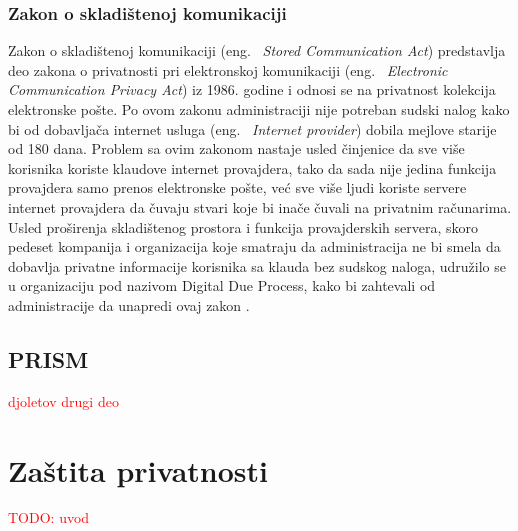 \documentclass[a4paper]{article}
\newcommand\todos[1]{\textcolor{red}{#1}}
\begin{document}
\subsubsection{Zakon o skladištenoj komunikaciji}
Zakon o skladištenoj komunikaciji (eng. ~{\em Stored Communication Act}) predstavlja deo zakona o privatnosti pri elektronskoj komunikaciji (eng. ~{\em Electronic Communication Privacy Act}) iz 1986. godine i odnosi se na privatnost kolekcija elektronske pošte. Po ovom zakonu administraciji nije potreban sudski nalog kako bi od dobavljača internet usluga (eng. ~{\em Internet provider})  dobila mejlove starije od 180 dana. Problem sa ovim zakonom nastaje usled činjenice da sve više korisnika koriste klaudove internet provajdera, tako da sada nije jedina funkcija provajdera samo prenos elektronske pošte, već sve više ljudi koriste servere internet provajdera da čuvaju stvari koje bi inače čuvali na privatnim računarima. Usled proširenja skladištenog prostora i funkcija provajderskih servera, skoro pedeset kompanija i organizacija koje smatraju da administracija ne bi smela da dobavlja privatne informacije korisnika sa klauda bez sudskog naloga, udružilo se u organizaciju pod nazivom Digital Due Process, kako bi zahtevali od administracije da unapredi ovaj zakon \cite{ddp}.



\subsection{PRISM}
\label{subsec:prism}


\todos{ djoletov drugi deo}

\section{Zaštita privatnosti}
\label{sec:zastita}

\todos{TODO: uvod}
\end{document}
